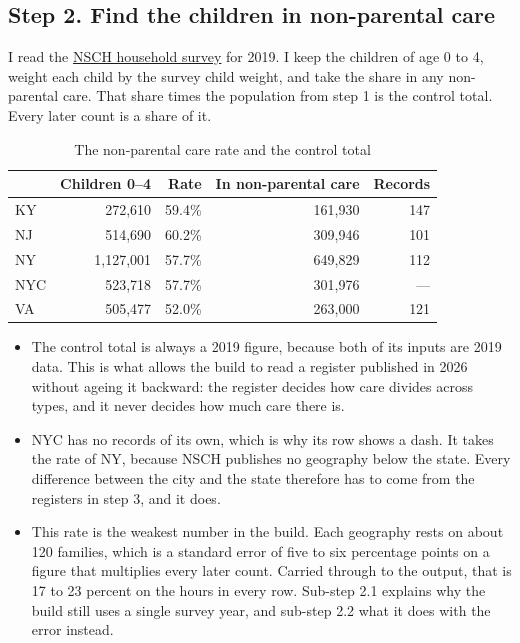 \documentclass[11pt]{article}
\begin{document}
\subsection*{Step 2. Find the children in non-parental care}

I read the
\href{https://www.census.gov/programs-surveys/nsch/data/datasets.html}{NSCH
household survey} for 2019. I keep the children of age 0 to 4, weight each child
by the survey child weight, and take the share in any non-parental care. That
share times the population from step 1 is the control total. Every later count
is a share of it.

\begin{table}[H]
\centering
\caption{The non-parental care rate and the control total}
\begin{tabular}{L{1.6cm}rrrr}
\toprule
& \textbf{Children 0--4} & \textbf{Rate} & \textbf{In non-parental care} & \textbf{Records} \\
\midrule
KY  &   272,610 & 59.4\% & 161,930 & 147 \\
NJ  &   514,690 & 60.2\% & 309,946 & 101 \\
NY  & 1,127,001 & 57.7\% & 649,829 & 112 \\
NYC &   523,718 & 57.7\% & 301,976 & --- \\
VA  &   505,477 & 52.0\% & 263,000 & 121 \\
\bottomrule
\end{tabular}
\end{table}

\begin{itemize}
\setlength{\itemsep}{0.45em}
\item The control total is always a 2019 figure, because both of its inputs are
      2019 data. This is what allows the build to read a register published in
      2026 without ageing it backward: the register decides how care divides
      across types, and it never decides how much care there is.
\item NYC has no records of its own, which is why its row shows a dash. It takes
      the rate of NY, because NSCH publishes no geography below the state. Every
      difference between the city and the state therefore has to come from the
      registers in step 3, and it does.
\item This rate is the weakest number in the build. Each geography rests on
      about 120 families, which is a standard error of five to six percentage
      points on a figure that multiplies every later count. Carried through to
      the output, that is 17 to 23 percent on the hours in every row. Sub-step
      2.1 explains why the build still uses a single survey year, and sub-step
      2.2 what it does with the error instead.
\end{itemize}
\end{document}

